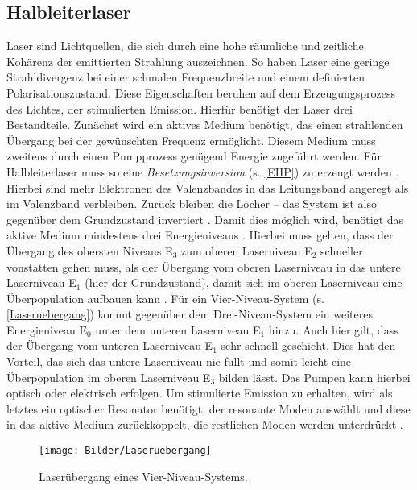 \subsection{Halbleiterlaser}
Laser sind Lichtquellen, die sich durch eine hohe räumliche und zeitliche Kohärenz der emittierten Strahlung auszeichnen. So haben Laser eine geringe Strahldivergenz bei einer schmalen Frequenzbreite und einem definierten Polarisationszustand. Diese Eigenschaften beruhen auf dem Erzeugungsprozess des Lichtes, der stimulierten Emission. Hierfür benötigt der Laser drei Bestandteile. Zunächst wird ein aktives Medium benötigt, das einen strahlenden Übergang bei der gewünschten Frequenz ermöglicht. Diesem Medium muss zweitens durch einen Pumpprozess genügend Energie zugeführt werden. Für Halbleiterlaser muss so  eine \textit{Besetzungsinversion} (s. \autoref{EHP}) zu erzeugt werden \cite{Kneubuhl.2008}. Hierbei sind mehr Elektronen des Valenzbandes in das Leitungsband angeregt als im Valenzband verbleiben. Zurück bleiben die Löcher – das System ist also gegenüber dem Grundzustand invertiert \cite{Kneubuhl.2008}. Damit dies möglich wird, benötigt das aktive Medium mindestens drei Energieniveaus \cite{Eichhorn.2013}. Hierbei muss gelten, dass der Übergang des obersten Niveaus E$_\text{3}$ zum oberen Laserniveau E$_\text{2}$ schneller vonstatten gehen muss, als der Übergang vom oberen Laserniveau in das untere Laserniveau E$_\text{1}$ (hier der Grundzustand), damit sich im oberen Laserniveau eine Überpopulation aufbauen kann \cite{Kneubuhl.2008}. Für ein Vier-Niveau-System (s. \autoref{Laseruebergang}) kommt gegenüber dem Drei-Niveau-System ein weiteres Energieniveau $\text{E}_\text{0}$ unter dem unteren Laserniveau E$_\text{1}$ hinzu. Auch hier gilt, dass der Übergang vom unteren Laserniveau E$_\text{1}$ sehr schnell geschieht. Dies hat den Vorteil, das sich das untere Laserniveau nie füllt und somit leicht eine Überpopulation im oberen Laserniveau E$_\text{3}$ bilden lässt. Das Pumpen kann hierbei optisch oder elektrisch erfolgen. Um stimulierte Emission zu erhalten, wird als letztes ein optischer Resonator benötigt, der resonante Moden auswählt und diese in das aktive Medium zurückkoppelt, die restlichen Moden werden unterdrückt \cite{Kneubuhl.2008}.
\begin{figure}[hb]
\texttt{[image: Bilder/Laseruebergang]}
\caption{Laserübergang eines Vier-Niveau-Systems.}
\label{Laseruebergang}
\end{figure}

